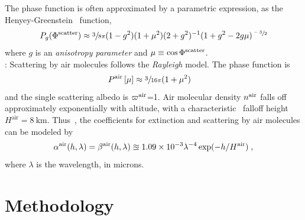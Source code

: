 \documentclass[10pt,letterpaper]{article}
\begin{document}
The phase function is often approximated by a parametric expression,
as the Henyey-Greenstein~\cite{Cornette1995} function,
\begin{align}
  P_g(\Phi^{\rm scatter})\approx \sfrac{3}{8\pi} (1 - g^2)(1+\mu^2)
  (2+g^2)^{-1}(1 + g^2 - 2g\mu)^{\sfrac{-3}{2}}
  \label{eq:aerosol_scatter}
\end{align}
where $g$ is an {\em anisotropy parameter} and $\mu\equiv \cos \Phi^{\rm scatter}$.
\\

: Scattering by air molecules follows the
{\em Rayleigh} model. The phase function is
\begin{align}
  P^{\rm air}\left[\mu\right] &\approx \sfrac{3}{16\pi}(1+\mu^2)
  \label{eq:rayleighP}
\end{align}
and the single scattering albedo is $\varpi^{\rm air}$=1. Air molecular density $n^{\rm air}$ falls
off approximately exponentially with altitude, with a
characteristic~\cite{Levi1980} falloff height $H^\mathrm{air}=8\
\si{\km}$. Thus~\cite{Levi1980}, the coefficients for
extinction and scattering by air molecules can be modeled by
\begin{align}
  \alpha^{\rm air}(h, \lambda)=\beta^{\rm air}(h, \lambda) \approxeq
  1.09 \times 10^{-3}\lambda^{-4}
  \exp(-h/H^\mathrm{air})
  \;,%
  \label{eq:rayleighbeta}
\end{align}
where $\lambda$ is the wavelength, in microns.


\section{Methodology}
\label{sec:methodology}
\end{document}

